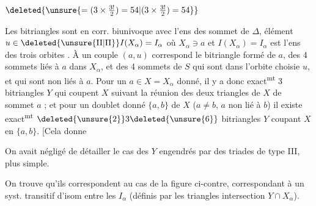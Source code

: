 $\deleted{\unsure{=(3\times\frac{3!}{2})=54|(3\times\frac{3!}{2})=54}}$


Les bitriangles sont en corr. biunivoque avec l'ens des  sommet de $\Delta$,   élément $u\in\deleted{\unsure{\mathrm{II}|\Pi}}I(X_\alpha)=I_\alpha$ où $X_\alpha\ni a$ et $I(X_\alpha)=I_\alpha$ est l'ens des trois orbites .
À un couple $(a,u)$ correspond le bitriangle formé de $a$, des 4 sommets liés à $a$ dans $X_\alpha$, et des 4 sommets de $S$ qui sont dans l'orbite choisie $u$, et qui sont non liés à $a$.
Pour un $a\in X=X_\alpha$ donné, il y a donc exact\textsuperscript{mt} 3 bitriangles $Y$ qui coupent $X$ suivant la réunion des deux triangles de $X$ de sommet $a$ ; et pour un doublet donné $\{a,b\}$ de $X$ ($a\ne b$, $a$ non lié à $b$) il existe exact\textsuperscript{mt} $\deleted{\unsure{2}}3\deleted{\unsure{6}}$ bitriangles $Y$ coupant $X$ en $\{a,b\}$. [Cela donne


On avait  négligé de détailler le cas des $Y$ engendrés par des triades de type III, plus simple.


On trouve qu'ils correspondent au cas de  la figure ci-contre, correspondant à un syst. transitif d'isom entre les $I_\alpha$ (définis par les triangles intersection $Y\cap X_\alpha$).

